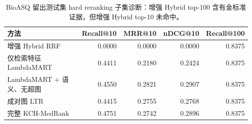 \begin{table}[t]
\centering
\small
\caption{BioASQ 留出测试集 hard reranking 子集诊断：增强 Hybrid top-100 含有金标准证据，但增强 Hybrid top-10 未命中。}
\label{tab:hard-subset-diagnostic}
\begin{tabular}{lrrrr}
\toprule
方法 & Recall@10 & MRR@10 & nDCG@10 & Recall@100 \\
\midrule
增强 Hybrid RRF & 0.0000 & 0.0000 & 0.0000 & 0.8375 \\
仅检索特征 LambdaMART & 0.4411 & 0.2180 & 0.2424 & 0.8375 \\
LambdaMART + 语义、无超图 & 0.4550 & 0.2821 & 0.2907 & 0.8375 \\
成对图 LTR & 0.4415 & 0.2755 & 0.2768 & 0.8375 \\
完整 KCH-MedRank & 0.4751 & 0.2742 & 0.2896 & 0.8375 \\
\bottomrule
\end{tabular}
\end{table}
